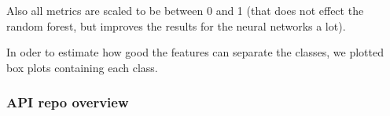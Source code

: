 \documentclass[a4paper]{scrartcl}
\begin{document}
	Also all metrics are scaled to be between 0 and 1 (that does not effect the random forest, but improves the results for the neural networks a lot).

	In oder to estimate how good the features can separate the classes, we plotted box plots containing each class.

		\subsubsection{API repo overview} %
		\label{ssub:api_repo_overview}

\end{document}
